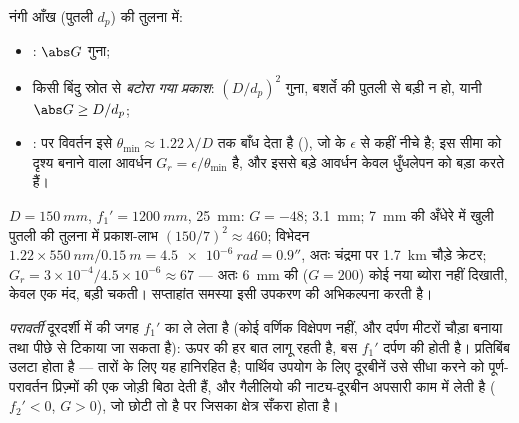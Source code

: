 \begin{proposition}[दूरदर्शी से क्या मिलता है]\label{prop:b1:optical-instruments:gains}
नंगी आँख (पुतली $d_p$) की तुलना में:
\begin{itemize}
  \item \emph{}: $\abs G$ गुना;
  \item किसी बिंदु स्रोत से \emph{बटोरा गया प्रकाश}:
        $(D/d_p)^2$ गुना, बशर्ते   की पुतली से बड़ी न हो,
        यानी $\abs G \geq D/d_p$;
  \item \emph{}:  पर विवर्तन इसे
        $\theta_{\min} \approx 1.22\,\lambda/D$ तक बाँध देता है (), जो  के $\epsilon$ से कहीं नीचे है; इस सीमा को दृश्य
        बनाने वाला आवर्धन $G_r = \epsilon/\theta_{\min}$ है,
        और इससे बड़े आवर्धन केवल धुँधलेपन को बड़ा करते हैं।
\end{itemize}
\end{proposition}
\admitted

\begin{example}\label{ex:b1:optical-instruments:telnum}
$D = \qty{150}{mm}$, $f_1' = \qty{1200}{mm}$,  \qty{25}{mm}:
$G = -48$;  \qty{3.1}{mm}; \qty{7}{mm} की अँधेरे में खुली पुतली की
तुलना में प्रकाश-लाभ $(150/7)^2 \approx
460$; विभेदन $1.22 \times
\qty{550}{nm}/\qty{0.15}{m} = \qty{4.5e-6}{rad} = 0.9''$, अतः चंद्रमा पर
\qty{1.7}{km} चौड़े क्रेटर; $G_r = 3\times10^{-4}/4.5\times
10^{-6} \approx 67$ --- अतः \qty{6}{mm} की  ($G = 200$) कोई नया
ब्योरा नहीं दिखाती, केवल एक मंद, बड़ी चकती। सप्ताहांत समस्या इसी उपकरण की
अभिकल्पना करती है।
\end{example}

\begin{remark}[परावर्ती दूरदर्शी, दूरबीन, नाट्य-दूरबीन]\label{rem:b1:optical-instruments:variants}
\emph{परावर्ती} दूरदर्शी में   की जगह  $f_1'$ का  ले लेता है (कोई वर्णिक विक्षेपण नहीं, और दर्पण मीटरों चौड़ा बनाया तथा
पीछे से टिकाया जा सकता है): ऊपर की हर बात लागू रहती है, बस $f_1'$ दर्पण की
 होती है। प्रतिबिंब उलटा होता है --- तारों के लिए यह हानिरहित है;
पार्थिव उपयोग के लिए दूरबीनें उसे सीधा करने को पूर्ण-परावर्तन प्रिज़्मों की एक
जोड़ी बिठा देती हैं, और गैलीलियो की नाट्य-दूरबीन अपसारी  काम में लेती
है ($f_2' < 0$, $G > 0$), जो छोटी तो है पर जिसका क्षेत्र सँकरा
होता है।
\end{remark}

